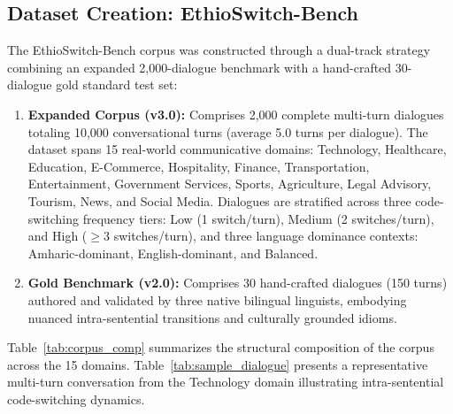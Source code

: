 \documentclass[11pt,a4paper]{article}
\begin{document}
\subsection{Dataset Creation: EthioSwitch-Bench}
The EthioSwitch-Bench corpus was constructed through a dual-track strategy combining an expanded 2,000-dialogue benchmark with a hand-crafted 30-dialogue gold standard test set:
\begin{enumerate}
    \item \textbf{Expanded Corpus (v3.0):} Comprises 2,000 complete multi-turn dialogues totaling 10,000 conversational turns (average 5.0 turns per dialogue). The dataset spans 15 real-world communicative domains: Technology, Healthcare, Education, E-Commerce, Hospitality, Finance, Transportation, Entertainment, Government Services, Sports, Agriculture, Legal Advisory, Tourism, News, and Social Media. Dialogues are stratified across three code-switching frequency tiers: Low (1 switch/turn), Medium (2 switches/turn), and High ($\ge 3$ switches/turn), and three language dominance contexts: Amharic-dominant, English-dominant, and Balanced.
    \item \textbf{Gold Benchmark (v2.0):} Comprises 30 hand-crafted dialogues (150 turns) authored and validated by three native bilingual linguists, embodying nuanced intra-sentential transitions and culturally grounded idioms.
\end{enumerate}

Table~\ref{tab:corpus_comp} summarizes the structural composition of the corpus across the 15 domains. Table~\ref{tab:sample_dialogue} presents a representative multi-turn conversation from the Technology domain illustrating intra-sentential code-switching dynamics.
\end{document}
